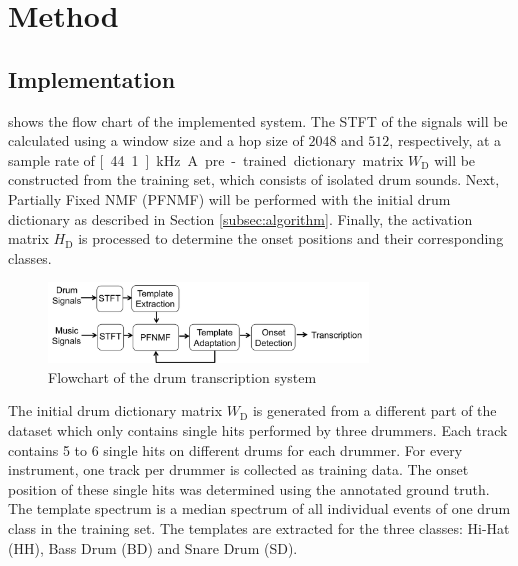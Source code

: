 \documentclass{article}
\begin{document}
\section{Method}\label{sec:method}
\subsection{Implementation}\label{subsec:processing steps}

 shows the flow chart of the implemented system. The STFT of the signals will be calculated using a window size and a hop size of $2048$ and $512$, respectively, at a sample rate of \unit[44.1]{kHz}. 
A pre-trained dictionary matrix $W_\mathrm{D}$ will be constructed from the training set, which consists of isolated drum sounds. 
Next, Partially Fixed NMF (PFNMF) will be performed with the initial drum dictionary %
as described in Section \ref{subsec:algorithm}. Finally, the activation matrix $H_\mathrm{D}$ is processed to determine the onset positions and their corresponding classes.  

\begin{figure}
 \centerline{%
 \includegraphics[width=8.5cm]{flowchart.png}}%
 \caption{Flowchart of the drum transcription system}
 \label{fig:flowchart}
\end{figure}

The initial drum dictionary matrix $W_\mathrm{D}$ is generated from a different part of the dataset which only contains single hits performed by three drummers. Each track contains 5 to 6 single hits on different drums for each drummer. For every instrument, one track per drummer is collected as training data. The onset position of these single hits was determined using the annotated ground truth. The template spectrum is a median spectrum of all individual events of one drum class in the training set. The templates are extracted for the three classes: Hi-Hat (HH), Bass Drum (BD) and Snare Drum (SD).   
\end{document}

